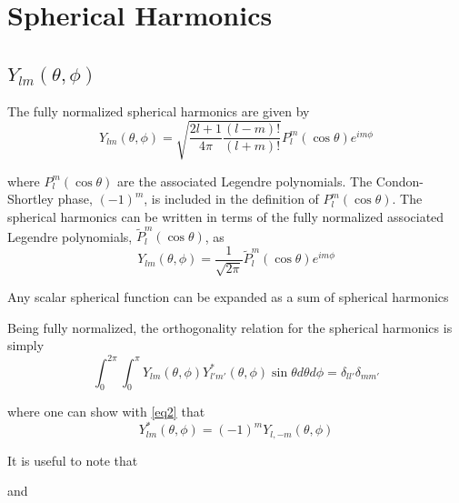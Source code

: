 {\footnotesize
{}
}
{\footnotesize
{}
}

{\footnotesize
{}
}


\clearpage
\section{Spherical Harmonics}

\subsection{$Y_{lm}(\theta,\phi)$}
The fully normalized spherical harmonics are given by
\begin{equation}
Y_{lm}(\theta,\phi) = \sqrt{\dfrac{2l+1}{4\pi}\dfrac{(l-m)!}{(l+m)!}}P_l^m(\cos\theta)e^{im\phi}
\end{equation}

\noindent where $P_l^m(\cos\theta)$ are the associated Legendre polynomials. The Condon-Shortley phase, $(-1)^m$, is included in the definition of $P_l^m(\cos\theta)$. The spherical harmonics can be written in terms of the fully normalized associated Legendre polynomials, $\widetilde P_l^m(\cos\theta)$, as 
\begin{equation}
Y_{lm}(\theta,\phi) = \dfrac{1}{\sqrt{2\pi}} \widetilde P_l^m(\cos\theta) e^{im\phi}
\end{equation}  

Any scalar spherical function can be expanded as a sum of spherical harmonics

Being fully normalized, the orthogonality relation for the spherical harmonics is simply
\begin{equation}
\int_0^{2\pi} \int_0^{\pi}Y_{lm}(\theta,\phi) Y^*_{l'm'}(\theta,\phi) \sin\theta d\theta d\phi = \delta_{ll'}\delta_{mm'}
\end{equation}

\noindent where one can show with \eqref{eq2} that
\begin{equation}
Y^*_{lm}(\theta,\phi) = (-1)^mY_{l,-m}(\theta,\phi) 
\label{eq1}
\end{equation}

It is useful to note that 

and 

